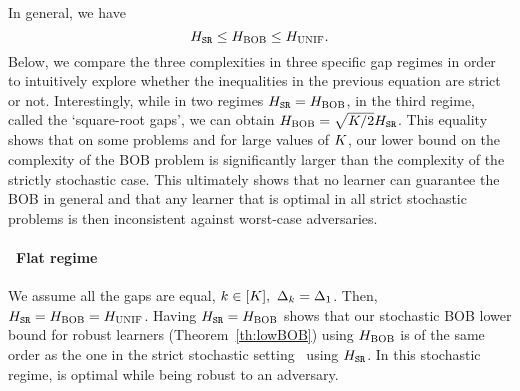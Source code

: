 \begin{remark}\label{rem:LOWbobCOMP}
	In general, we have
	\[
	H_{{\normalfont \texttt{SR}}}\leq H_{{\normalfont \textsc{{BOB}}}}\leq H_{{\normalfont \textsc{UNIF}}}.
	\]
Below, we compare the three  complexities in 
three specific gap regimes in order to intuitively explore   whether
the inequalities in the previous equation are strict or not. 
Interestingly, while in two regimes  $H_{{\normalfont \texttt{SR}}}=H_{{\normalfont \textsc{{BOB}}}}$, in the third regime, called the `square-root gaps', we can obtain $H_{{\normalfont \textsc{{BOB}}}}=\sqrt{K/2}H_{{\normalfont \texttt{SR}}}$.  
This equality shows that on some problems and for large values of $K$,
 our lower bound on 
the complexity of the BOB problem is 
significantly larger than the complexity of the strictly stochastic case.
This ultimately shows that no  learner can guarantee the BOB in general   and that any learner  that is optimal in all strict stochastic problems is then inconsistent against
worst-case adversaries.
	\end{remark}
	\paragraph{\raisebox{.04cm}{\textcolor{bull}{$\blacktriangleright$}}~Flat regime}  We assume all the gaps are equal, 
$k\in[K],~ \Delta_k=\Delta_{1}$. Then, 
$H_{{\normalfont \texttt{SR}}}=H_{{\normalfont \textsc{{BOB}}}}=H_{{\normalfont \textsc{UNIF}}}$. Having $H_{{\normalfont \texttt{SR}}}=H_{{\normalfont \textsc{{BOB}}}}$  shows that our  
stochastic BOB lower bound for robust learners (Theorem~\ref{th:lowBOB}) using $H_{{\normalfont \textsc{{BOB}}}}$ is of the same order as the one in the 
strict stochastic setting~\citep{Audibert10BA} using $H_{{\normalfont \texttt{SR}}}$.   
In this stochastic regime, \RULE{} is optimal while being robust to an adversary.
%
